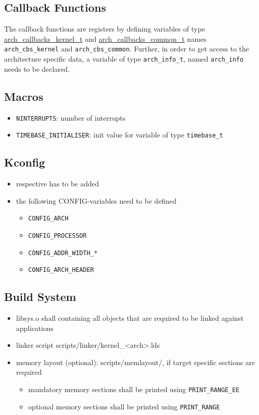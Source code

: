 	\subsection{Callback Functions}
		The callback functions are registers by defining variables of type \hyperref[structarch__callbacks__kernel__t]{arch\_callbacks\_kernel\_t} and \hyperref[structarch__callbacks__common__t]{arch\_callbacks\_common\_t} names \lstinline{arch_cbs_kernel} and \lstinline{arch_cbs_common}. Further, in order to get access to the architecture specific data, a variable of type \lstinline{arch_info_t}, named \lstinline{arch_info} needs to be declared.

	\subsection{Macros}
		\begin{itemize}
			\item \lstinline{NINTERRUPTS}: number of interrupts
			\item \lstinline{TIMEBASE_INITIALISER}: init value for variable of type \lstinline{timebase_t}\\
		\end{itemize}

	\subsection{Kconfig}
		\begin{itemize}
			\item respective  has to be added
			\item the following CONFIG-variables need to be defined
				\begin{itemize}
					\item \lstinline{CONFIG_ARCH}
					\item \lstinline{CONFIG_PROCESSOR}
					\item \lstinline{CONFIG_ADDR_WIDTH_*}
					\item \lstinline{CONFIG_ARCH_HEADER}
				\end{itemize}
		\end{itemize}

	\subsection{Build System}
		\begin{itemize}
			\item libsys.o shall containing all objects that are required to be linked against applications
			\item linker script scripts/linker/kernel\_<arch>.lds
			\item memory layout (optional): scripts/memlayout/, if target specific sections are required
				\begin{itemize}
					\item mandatory memory sections shall be printed using \lstinline{PRINT_RANGE_EE}
					\item optional memory sections shall be printed using \lstinline{PRINT_RANGE}
				\end{itemize}
		\end{itemize}

\vfill
\pagebreak

